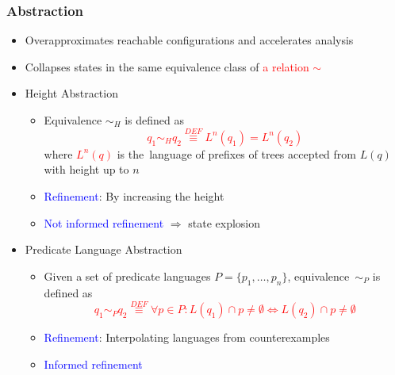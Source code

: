 \documentclass{beamer}
\newcommand{\hlbl}[1]{\textcolor{blue}{#1}}
\newcommand{\hlgr}[1]{\textcolor{olive!50!green}{#1}}
\newcommand{\hlrd}[1]{\textcolor{red}{#1}}
\begin{document}
\begin{frame}
\frametitle{Abstraction}

	\begin{itemize}
		\item Overapproximates reachable configurations and accelerates analysis
		\item Collapses states in the same equivalence class of \hlrd{a relation $\sim$}
		\item \hlgr{Height Abstraction}
		\begin{itemize}
			\item Equivalence $\sim_H$ is defined as
				\hlrd{$$q_1 \sim_H q_2 \stackrel{DEF}{\equiv} L^n(q_1) = L^n(q_2)$$}\noindent where
				\hlrd{$L^n(q)$} is the~language of prefixes of trees accepted from $L(q)$ with height up to $n$
			\item \hlbl{Refinement}: By increasing the height
			\item \hlbl{Not informed refinement} $\Rightarrow$ state explosion
		\end{itemize}

		\pause
	    \item \hlgr{Predicate Language Abstraction}
		\begin{itemize}
			\item Given a set of predicate languages $P=\{p_1,\ldots,p_n\}$,
				equivalence~$\sim_P$ is defined as
				\hlrd{$$q_1 \sim_P q_2 \stackrel{DEF}{\equiv} \forall p\in P: L(q_1) \cap p \neq \emptyset \Leftrightarrow L(q_2) \cap p \neq \emptyset$$}
			\item \hlbl{Refinement}: Interpolating languages from counterexamples
			\item \hlbl{Informed refinement} 
		\end{itemize}
	\end{itemize}


\end{frame}

\end{document}
